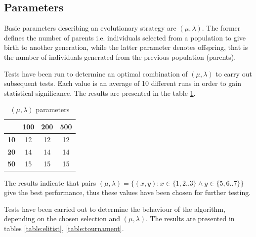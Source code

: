 \documentclass[a4paper]{article}
\begin{document}
\subsection{Parameters}
Basic parameters describing an evolutionary strategy are $(\mu, \lambda)$. The former defines the number of parents i.e. individuals selected from a population to give birth to another generation, while the latter parameter denotes offspring, that is the number of individuals generated from the previous population (parents).

Tests have been run to determine an optimal combination of $(\mu, \lambda)$ to carry out subsequent tests. Each value is an average of 10 different runs in order to gain statistical significance. The results are presented in the table \ref{table:params}.

\begin{table}[h]
\centering
\caption{ $(\mu, \lambda)$ parameters}
\label{table:params}
\begin{tabular}{c|c|c|c}
& \textbf{100} & \textbf{200} & \textbf{500} \\
\hline
\textbf{10} & 12 & 12 & 12 \\
\hline
\textbf{20} & 14 & 14 & 14 \\
\hline
\textbf{50} & 15 & 15 & 15\\
\end{tabular}
\end{table}

The results indicate that pairs $(\mu, \lambda) = \{(x,y) : x \in \{1,2..3\} \wedge y \in \{5,6..7\}\}$ give the best performance, thus these values have been chosen for further testing.

Tests have been carried out to determine the behaviour of the algorithm, depending on the chosen selection and $(\mu, \lambda)$. The results are presented in tables \ref{table:elitist}, \ref{table:tournament}.
\end{document}
